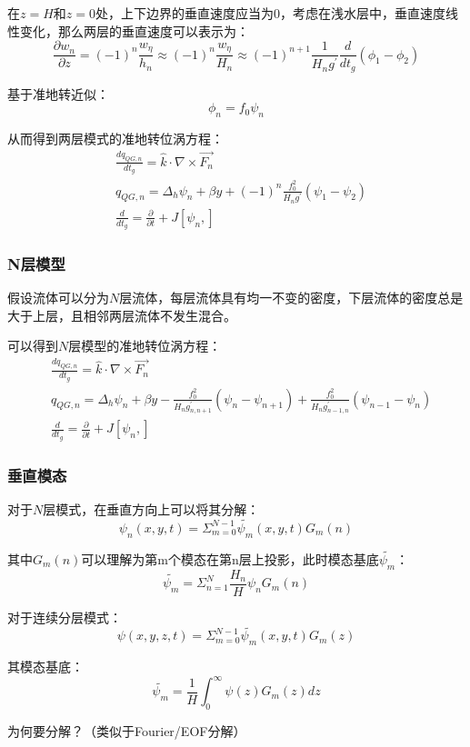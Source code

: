 \documentclass{article}
\begin{document}
在$z=H$和$z=0$处，上下边界的垂直速度应当为0，考虑在浅水层中，垂直速度线性变化，那么两层的垂直速度可以表示为：
$$\frac{\partial w_n}{\partial z}=(-1)^n\frac{w_\eta}{h_n}\approx(-1)^n\frac{w_\eta}{H_n}\approx(-1)^{n+1}\frac{1}{H_ng^{\prime}}\frac{d}{dt_g}(\phi_1-\phi_2)$$

基于准地转近似：
$$\phi_n=f_0\psi_n$$

从而得到两层模式的准地转位涡方程：
\begin{align}
    &\frac{dq_{QG,n}}{dt_g} = \hat{k}\cdot\nabla\times\vec{F_n} \\
    &q_{QG,n} = \Delta_h \psi_n + \beta y + (-1)^{n}\frac{f_0^2}{H_ng^{\prime}}(\psi_1-\psi_2)\\
    &\frac{d}{dt_g} = \frac{\partial }{\partial t} + J[\psi_n, ]
\end{align}


\subsubsection{N层模型}
假设流体可以分为$N$层流体，每层流体具有均一不变的密度，下层流体的密度总是大于上层，且相邻两层流体不发生混合。

可以得到$N$层模型的准地转位涡方程：
\begin{align}
    &\frac{dq_{QG,n}}{dt_g} = \hat{k}\cdot\nabla\times\vec{F_n} \\
    &q_{QG,n} = \Delta_h \psi_n 
    + \beta y 
    - \frac{f_0^2}{H_ng^{\prime}_{n,n+1}}(\psi_n-\psi_{n+1}) 
    + \frac{f_0^2}{H_ng^{\prime}_{n-1,n}}(\psi_{n-1}-\psi_{n}) \\
    &\frac{d}{dt_g} = \frac{\partial }{\partial t} + J[\psi_n, ]
\end{align}

\subsubsection{垂直模态}
对于$N$层模式，在垂直方向上可以将其分解：
$$\psi_n(x,y,t) = \Sigma_{m=0}^{N-1}\tilde{\psi_m}(x,y,t)G_m(n)$$

其中$G_m(n)$可以理解为第m个模态在第n层上投影，此时模态基底$\tilde{\psi_m}$：
$$\tilde{\psi_m}=\Sigma_{n=1}^{N}\frac{H_n}{H}\psi_nG_m(n)$$

对于连续分层模式：
$$\psi(x,y,z,t) = \Sigma_{m=0}^{N-1}\tilde{\psi_m}(x,y,t)G_m(z)$$

其模态基底：
$$\tilde{\psi_m}=\frac{1}{H}\int_{0}^{\infty}\psi(z)G_m(z)dz$$

为何要分解？（类似于Fourier/EOF分解）
\end{document}
